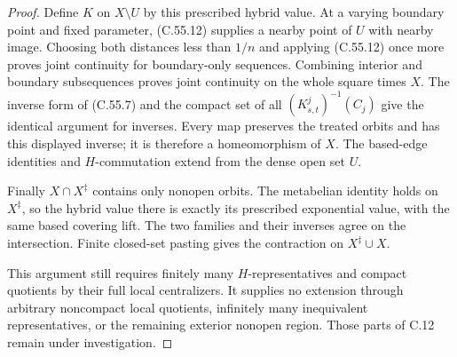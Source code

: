 \begin{proof}
Define $K$ on $X\setminus U$ by this prescribed
hybrid value. At a varying boundary point and fixed
parameter, (C.55.12) supplies a nearby point of $U$
with nearby image. Choosing both distances less
than $1/n$ and applying (C.55.12) once more proves
joint continuity for boundary-only sequences.
Combining interior and boundary subsequences proves
joint continuity on the whole square times $X$.
The inverse form of (C.55.7) and the compact set of
all $(K^j_{s,t})^{-1}(C_j)$ give the identical argument
for inverses. Every map preserves the treated orbits
and has this displayed inverse; it is therefore a
homeomorphism of $X$. The based-edge identities and
$H$-commutation extend from the dense open set $U$.

Finally $X\cap X^\ddagger$ contains only nonopen
orbits. The metabelian identity holds on
$X^\ddagger$, so the hybrid value there is exactly
its prescribed exponential value, with the same
based covering lift. The two families and their
inverses agree on the intersection. Finite closed-set
pasting gives the contraction on $X^\ddagger\cup X$.

This argument still requires finitely many
$H$-representatives and compact quotients by their
full local centralizers. It supplies no extension
through arbitrary noncompact local quotients,
infinitely many inequivalent representatives, or
the remaining exterior nonopen region. Those parts
of C.12 remain under investigation.
\end{proof}
